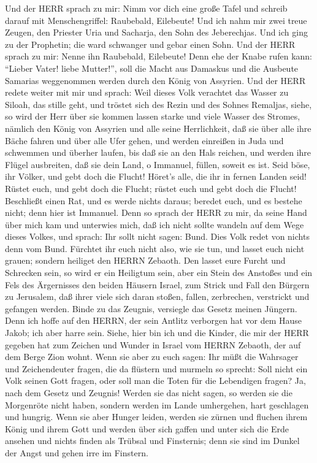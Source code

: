  Und der HERR sprach zu mir: Nimm vor dich eine große Tafel
und schreib darauf mit Menschengriffel: Raubebald, Eilebeute!
 Und ich nahm mir zwei treue Zeugen, den Priester Uria und
Sacharja, den Sohn des Jeberechjas.  Und ich ging zu der
Prophetin; die ward schwanger und gebar einen Sohn. Und der HERR sprach
zu mir: Nenne ihn Raubebald, Eilebeute!  Denn ehe der Knabe
rufen kann: ``Lieber Vater! liebe Mutter!'', soll die Macht aus Damaskus
und die Ausbeute Samarias weggenommen werden durch den König von
Assyrien.  Und der HERR redete weiter mit mir und sprach:
 Weil dieses Volk verachtet das Wasser zu Siloah, das stille
geht, und tröstet sich des Rezin und des Sohnes Remaljas, 
siehe, so wird der Herr über sie kommen lassen starke und viele Wasser
des Stromes, nämlich den König von Assyrien und alle seine Herrlichkeit,
daß sie über alle ihre Bäche fahren und über alle Ufer gehen,
 und werden einreißen in Juda und schwemmen und überher
laufen, bis daß sie an den Hals reichen, und werden ihre Flügel
ausbreiten, daß sie dein Land, o Immanuel, füllen, soweit es ist.
 Seid böse, ihr Völker, und gebt doch die Flucht! Höret's
alle, die ihr in fernen Landen seid! Rüstet euch, und gebt doch die
Flucht; rüstet euch und gebt doch die Flucht!  Beschließt
einen Rat, und es werde nichts daraus; beredet euch, und es bestehe
nicht; denn hier ist Immanuel.  Denn so sprach der HERR zu
mir, da seine Hand über mich kam und unterwies mich, daß ich nicht
sollte wandeln auf dem Wege dieses Volkes, und sprach:  Ihr
sollt nicht sagen: Bund. Dies Volk redet von nichts denn vom Bund.
Fürchtet ihr euch nicht also, wie sie tun, und lasset euch nicht grauen;
 sondern heiliget den HERRN Zebaoth. Den lasset eure Furcht
und Schrecken sein,  so wird er ein Heiligtum sein, aber
ein Stein des Anstoßes und ein Fels des Ärgernisses den beiden Häusern
Israel, zum Strick und Fall den Bürgern zu Jerusalem,  daß
ihrer viele sich daran stoßen, fallen, zerbrechen, verstrickt und
gefangen werden.  Binde zu das Zeugnis, versiegle das
Gesetz meinen Jüngern.  Denn ich hoffe auf den HERRN, der
sein Antlitz verborgen hat vor dem Hause Jakob; ich aber harre sein.
 Siehe, hier bin ich und die Kinder, die mir der HERR
gegeben hat zum Zeichen und Wunder in Israel vom HERRN Zebaoth, der auf
dem Berge Zion wohnt.  Wenn sie aber zu euch sagen: Ihr
müßt die Wahrsager und Zeichendeuter fragen, die da flüstern und murmeln
so sprecht: Soll nicht ein Volk seinen Gott fragen, oder soll man die
Toten für die Lebendigen fragen?  Ja, nach dem Gesetz und
Zeugnis! Werden sie das nicht sagen, so werden sie die Morgenröte nicht
haben,  sondern werden im Lande umhergehen, hart geschlagen
und hungrig. Wenn sie aber Hunger leiden, werden sie zürnen und fluchen
ihrem König und ihrem Gott  und werden über sich gaffen und
unter sich die Erde ansehen und nichts finden als Trübsal und
Finsternis; denn sie sind im Dunkel der Angst und gehen irre im
Finstern.

